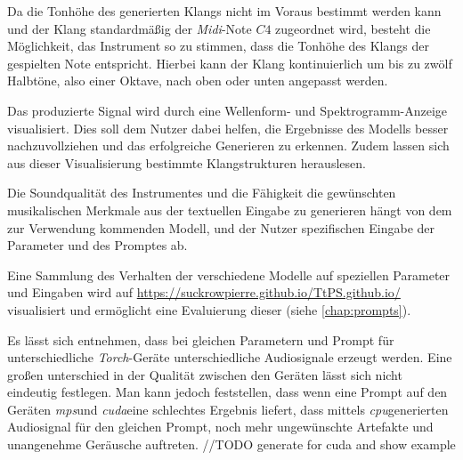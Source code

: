 \documentclass[
  a4paper,  %
  twoside,  %
  bibliography=totoc,
  headsepline,
  cleardoublepage=empty,
  parskip=half,
  draft=false
]{scrbook}
\begin{document}
Da die Tonhöhe des generierten Klangs nicht im Voraus bestimmt werden kann und der Klang standardmäßig der \emph{Midi}-Note $C4$ zugeordnet wird, besteht die Möglichkeit, das Instrument so zu stimmen, dass die Tonhöhe des Klangs der gespielten Note entspricht. Hierbei kann der Klang kontinuierlich um bis zu zwölf Halbtöne, also einer Oktave, nach oben oder unten angepasst werden.

Das produzierte Signal wird durch eine Wellenform- und Spektrogramm-Anzeige visualisiert. Dies soll dem Nutzer dabei helfen, die Ergebnisse des Modells besser nachzuvollziehen und das erfolgreiche Generieren zu erkennen. Zudem lassen sich aus dieser Visualisierung bestimmte Klangstrukturen herauslesen.

Die Soundqualität des Instrumentes und die Fähigkeit die gewünschten musikalischen Merkmale aus der textuellen Eingabe zu generieren hängt von dem zur Verwendung kommenden Modell, und der Nutzer spezifischen Eingabe der Parameter und des Promptes ab. 

Eine Sammlung des Verhalten der verschiedene Modelle auf speziellen Parameter und Eingaben wird auf \url{https://suckrowpierre.github.io/TtPS.github.io/}\cite{pierre-louis_suckrow_text-zu-spielbarem-klang_nodate}  visualisiert und ermöglicht eine Evaluierung dieser (siehe \ref{chap:prompts}).

Es lässt sich entnehmen, dass bei gleichen Parametern und Prompt für unterschiedliche \emph{Torch}-Geräte unterschiedliche Audiosignale erzeugt werden. Eine großen unterschied in der Qualität zwischen den Geräten lässt sich nicht eindeutig festlegen. Man kann jedoch feststellen, dass wenn eine Prompt auf den Geräten \glqq\emph{mps}\grqq und \glqq\emph{cuda}\grqq eine schlechtes Ergebnis liefert, dass mittels \glqq\emph{cpu}\grqq generierten Audiosignal für den gleichen Prompt, noch mehr ungewünschte Artefakte und unangenehme Geräusche auftreten. //TODO generate for cuda and show example
\end{document}
